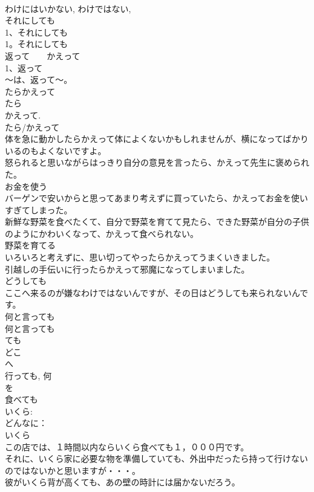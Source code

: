 \documentclass[8pt]{extreport}
\begin{document}
\begin{CJK}{UTF8}{min}
\\	わけにはいかない, わけではない, 
\\	それにしても
\\	1、それにしても
\\	1。それにしても
\\	返って　　かえって
\\	1、返って
\\	～は、返って～。
\\	たらかえって
\\	たら 
\\	かえって.
\\	たら/かえって 
\\	体を急に動かしたらかえって体によくないかもしれませんが、横になってばかりいるのもよくないですよ。
\\	怒られると思いながらはっきり自分の意見を言ったら、かえって先生に褒められた。
\\	お金を使う　　
\\	バーゲンで安いからと思ってあまり考えずに買っていたら、かえってお金を使いすぎてしまった。
\\	新鮮な野菜を食べたくて、自分で野菜を育てて見たら、できた野菜が自分の子供のようにかわいくなって、かえって食べられない。
\\	野菜を育てる
\\	いろいろと考えずに、思い切ってやったらかえってうまくいきました。
\\	引越しの手伝いに行ったらかえって邪魔になってしまいました。
\\	どうしても
\\	ここへ来るのが嫌なわけではないんですが、その日はどうしても来られないんです。
\\	何と言っても
\\	何と言っても
\\	ても
\\	どこ
\\	へ
\\	行っても, 何
\\	を
\\	食べても
\\	いくら: 
\\	どんなに： 
\\	いくら 
\\	この店では、１時間以内ならいくら食べても１，０００円です。
\\	それに、いくら家に必要な物を準備していても、外出中だったら持って行けないのではないかと思いますが・・・。
\\	彼がいくら背が高くても、あの壁の時計には届かないだろう。

\end{CJK}
\end{document}
